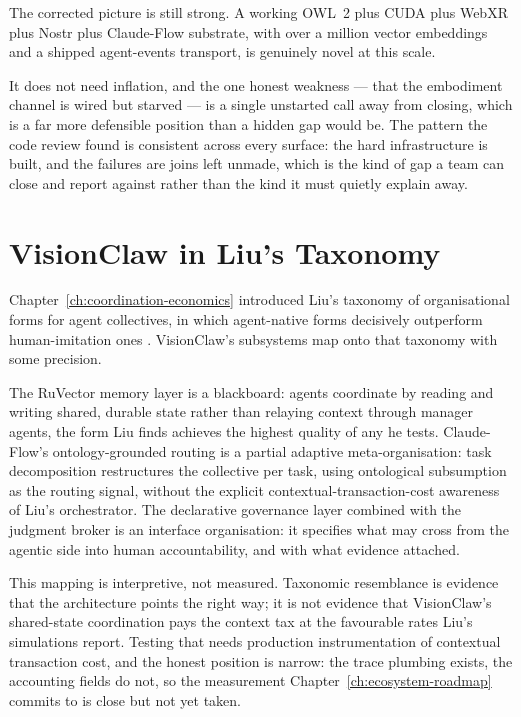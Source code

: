 The corrected picture is still strong. A working OWL~2 plus CUDA plus WebXR plus Nostr plus Claude-Flow substrate, with over a million vector embeddings and a shipped agent-events transport, is genuinely novel at this scale.

It does not need inflation, and the one honest weakness --- that the embodiment channel is wired but starved --- is a single unstarted call away from closing, which is a far more defensible position than a hidden gap would be. The pattern the code review found is consistent across every surface: the hard infrastructure is built, and the failures are joins left unmade, which is the kind of gap a team can close and report against rather than the kind it must quietly explain away.

\section{VisionClaw in Liu's Taxonomy}

Chapter~\ref{ch:coordination-economics} introduced Liu's taxonomy of organisational forms for agent collectives, in which agent-native forms decisively outperform human-imitation ones \parencite{Liu2026}. VisionClaw's subsystems map onto that taxonomy with some precision.

The RuVector memory layer is a blackboard: agents coordinate by reading and writing shared, durable state rather than relaying context through manager agents, the form Liu finds achieves the highest quality of any he tests. Claude-Flow's ontology-grounded routing is a partial adaptive meta-organisation: task decomposition restructures the collective per task, using ontological subsumption as the routing signal, without the explicit contextual-transaction-cost awareness of Liu's orchestrator. The declarative governance layer combined with the judgment broker is an interface organisation: it specifies what may cross from the agentic side into human accountability, and with what evidence attached.

This mapping is interpretive, not measured. Taxonomic resemblance is evidence that the architecture points the right way; it is not evidence that VisionClaw's shared-state coordination pays the context tax at the favourable rates Liu's simulations report. Testing that needs production instrumentation of contextual transaction cost, and the honest position is narrow: the trace plumbing exists, the accounting fields do not, so the measurement Chapter~\ref{ch:ecosystem-roadmap} commits to is close but not yet taken.

